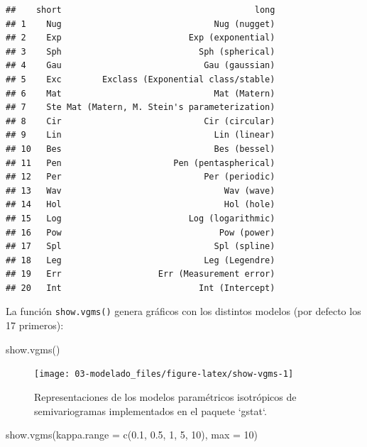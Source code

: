 \documentclass[
  spanish,
]{book}
\newenvironment{Shaded}{\begin{snugshade}}{\end{snugshade}}
\newcommand{\AttributeTok}[1]{\textcolor[rgb]{0.77,0.63,0.00}{#1}}
\newcommand{\DecValTok}[1]{\textcolor[rgb]{0.00,0.00,0.81}{#1}}
\newcommand{\FloatTok}[1]{\textcolor[rgb]{0.00,0.00,0.81}{#1}}
\newcommand{\FunctionTok}[1]{\textcolor[rgb]{0.00,0.00,0.00}{#1}}
\newcommand{\NormalTok}[1]{#1}
\theoremstyle{break}
\theoremstyle{definition}
\theoremstyle{definition}
\theoremstyle{definition}
\theoremstyle{definition}
\theoremstyle{remark}
\begin{document}
\begin{verbatim}
##    short                                      long
## 1    Nug                              Nug (nugget)
## 2    Exp                         Exp (exponential)
## 3    Sph                           Sph (spherical)
## 4    Gau                            Gau (gaussian)
## 5    Exc        Exclass (Exponential class/stable)
## 6    Mat                              Mat (Matern)
## 7    Ste Mat (Matern, M. Stein's parameterization)
## 8    Cir                            Cir (circular)
## 9    Lin                              Lin (linear)
## 10   Bes                              Bes (bessel)
## 11   Pen                      Pen (pentaspherical)
## 12   Per                            Per (periodic)
## 13   Wav                                Wav (wave)
## 14   Hol                                Hol (hole)
## 15   Log                         Log (logarithmic)
## 16   Pow                               Pow (power)
## 17   Spl                              Spl (spline)
## 18   Leg                            Leg (Legendre)
## 19   Err                   Err (Measurement error)
## 20   Int                           Int (Intercept)
\end{verbatim}

La función \texttt{show.vgms()} genera gráficos con los distintos modelos (por defecto los 17 primeros):

\begin{Shaded}
\begin{Highlighting}[]
\FunctionTok{show.vgms}\NormalTok{()}
\end{Highlighting}
\end{Shaded}

\begin{figure}[!htb]

{\centering \texttt{[image: 03-modelado\_files/figure-latex/show-vgms-1]} 

}

\caption{Representaciones de los modelos paramétricos isotrópicos de semivariogramas implementados en el paquete `gstat`.}\label{fig:show-vgms}
\end{figure}

\begin{Shaded}
\begin{Highlighting}[]
\FunctionTok{show.vgms}\NormalTok{(}\AttributeTok{kappa.range =} \FunctionTok{c}\NormalTok{(}\FloatTok{0.1}\NormalTok{, }\FloatTok{0.5}\NormalTok{, }\DecValTok{1}\NormalTok{, }\DecValTok{5}\NormalTok{, }\DecValTok{10}\NormalTok{), }\AttributeTok{max =} \DecValTok{10}\NormalTok{)}
\end{Highlighting}
\end{Shaded}
\end{document}
